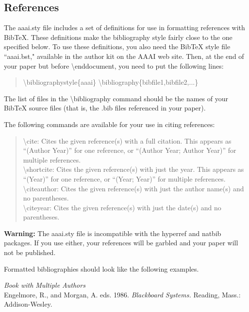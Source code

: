 \documentclass[letterpaper]{article}
\begin{document}
\subsection{References} 
The aaai.sty file includes a set of definitions for use in formatting references with BibTeX. These definitions make the bibliography style fairly close to the one specified below. To use these definitions, you also need the BibTeX style file ``aaai.bst," available in the author kit on the AAAI web site. Then, at the end of your paper but before \textbackslash end{document}, you need to put the following lines:

\begin{quote}
\begin{small}
\textbackslash bibliographystyle\{aaai\}
\textbackslash bibliography\{bibfile1,bibfile2,...\}
\end{small}
\end{quote}

The list of files in the \textbackslash  bibliography command should be the names of your BibTeX source files (that is, the .bib files referenced in your paper).

The following commands are available for your use in citing references:
\begin{quote}
\begin{small}
\textbackslash cite: Cites the given reference(s) with a full citation. This appears as ``(Author Year)'' for one reference, or ``(Author Year; Author Year)'' for multiple references.\\
\textbackslash shortcite: Cites the given reference(s) with just the year. This appears as ``(Year)'' for one reference, or ``(Year; Year)'' for multiple references.\\
\textbackslash citeauthor: Cites the given reference(s) with just the author name(s) and no parentheses.\\
\textbackslash citeyear: Cites the given reference(s) with just the date(s) and no parentheses.
\end{small}
\end{quote}

\textbf{Warning:} The aaai.sty file is incompatible with the hyperref and natbib packages. If you use either, your references will be garbled and your paper will not be published.

Formatted bibliographies should look like the following examples.

\smallskip \noindent \textit{Book with Multiple Authors}\\
Engelmore, R., and Morgan, A. eds. 1986. \textit{Blackboard Systems.} Reading, Mass.: Addison-Wesley.
\end{document}
